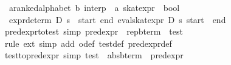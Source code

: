 \begin{isabellebody}
\ \ {}{}{}a{}{}ranked{}alphabet{}\ {}b{}\ interp\ {}\ {}a\ skat{}expr\ {}\ bool{}\isanewline
\ \ \isanewline
\ \ {}expr{}determ\ D\ s\ {}\ {}start{}\ {}{}end{}\ eval{}skat{}expr\ D\ s\ {}start{}\ {}\ {}end{}{}\isanewline
\isanewline
{}\isamarkupfalse%
\ pred{}expr{}to{}test\ {}simp{}{}\ {}pred{}expr\ {}\ rep{}bterm\ {}\ test{}\isanewline
%
\isadelimproof
\ \ %
\endisadelimproof
%
\isatagproof
{}\isamarkupfalse%
\ {}rule\ ext{}\ simp\ add{}\ o{}def\ test{}def\ pred{}expr{}def{}%
\endisatagproof
{\isafoldproof}%
%
\isadelimproof
\isanewline
%
\endisadelimproof
\isanewline
{}\isamarkupfalse%
\ test{}to{}pred{}expr\ {}simp{}{}\ {}test\ {}\ abs{}bterm\ {}\ pred{}expr{}\isanewline

\end{isabellebody}
